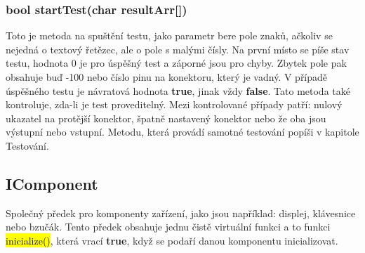 \subsubsection{bool startTest(char resultArr[])}
Toto je metoda na spuštění testu, jako parametr bere pole znaků, ačkoliv se nejedná o textový řetězec, ale o pole s malými čísly. Na první místo se píše stav testu, hodnota 0 je pro úspěšný test a záporné jsou pro chyby. Zbytek pole pak obsahuje buď -100 nebo číslo pinu na konektoru, který je vadný. V případě úspěšného testu je návratová hodnota \textbf{true}, jinak vždy \textbf{false}. Tato metoda také kontroluje, zda-li je test proveditelný. Mezi kontrolované případy patří: nulový ukazatel na protější konektor, špatně nastavený konektor nebo že oba jsou výstupní nebo vstupní. Metodu, která provádí samotné testování popíši v kapitole Testování.

\subsection{IComponent}
Společný předek pro komponenty zařízení, jako jsou například: displej, klávesnice nebo bzučák. Tento předek obsahuje jednu čistě virtuální funkci a to funkci \hl{inicialize()}, která vrací \textbf{true}, když se podaří danou komponentu inicializovat.
